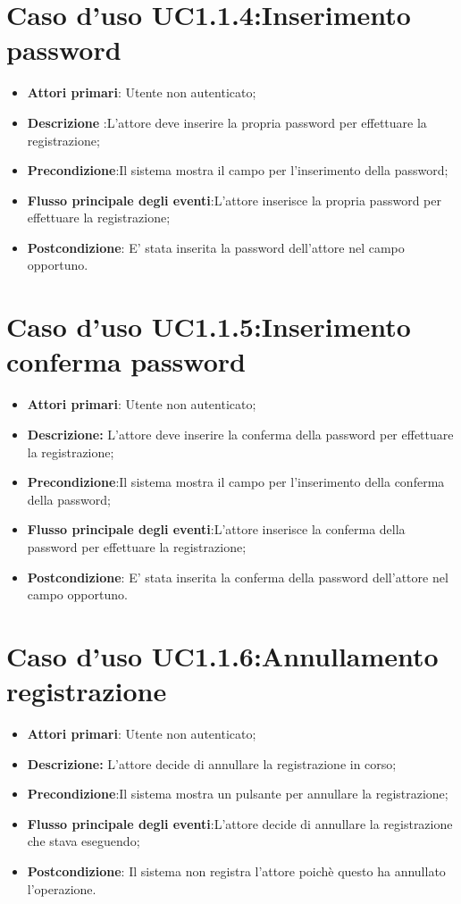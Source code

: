 \section{Caso d'uso UC1.1.4:Inserimento  password}
	\begin{itemize}
		\item \textbf{Attori primari}: Utente non autenticato;
		\item \textbf{Descrizione} :L'attore deve inserire la propria password per effettuare la registrazione;
		\item \textbf{Precondizione}:Il sistema mostra il campo per l'inserimento della password;
		\item \textbf{Flusso principale degli eventi}:L'attore inserisce la propria password per effettuare la registrazione;
		\item \textbf{Postcondizione}: E' stata inserita la password dell'attore nel campo opportuno.
	\end{itemize}

\section{Caso d'uso UC1.1.5:Inserimento  conferma password}
\begin{itemize}
	\item \textbf{Attori primari}: Utente non autenticato;
	\item \textbf{Descrizione:} L'attore deve inserire la conferma della password per effettuare la registrazione;
	\item \textbf{Precondizione}:Il sistema mostra il campo per l'inserimento della conferma della password;
	\item \textbf{Flusso principale degli eventi}:L'attore inserisce la conferma della password per effettuare la registrazione;
	\item \textbf{Postcondizione}: E' stata inserita la conferma della password dell'attore nel campo opportuno.
\end{itemize}

\section{Caso d'uso UC1.1.6:Annullamento registrazione}
\begin{itemize}
	\item \textbf{Attori primari}: Utente non autenticato;
	\item \textbf{Descrizione:} L'attore decide di annullare la registrazione in corso;
	\item \textbf{Precondizione}:Il sistema mostra un pulsante per annullare la  registrazione;
	\item \textbf{Flusso principale degli eventi}:L'attore decide di annullare la registrazione che stava eseguendo;
	\item \textbf{Postcondizione}: Il sistema non registra l'attore poichè questo ha annullato l'operazione.
\end{itemize}

